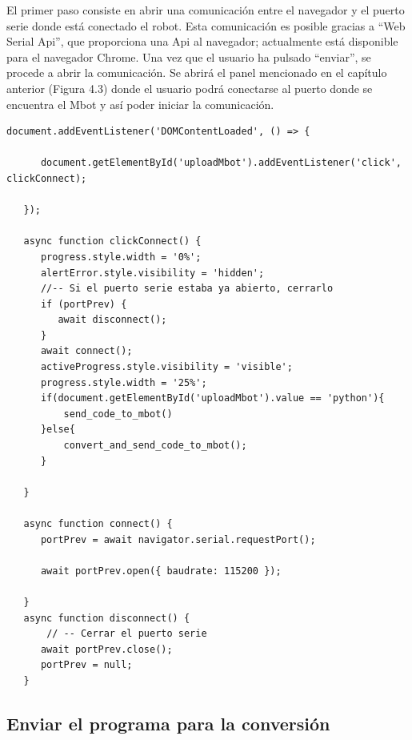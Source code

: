 \documentclass{report}
\begin{document}
El primer paso consiste en abrir una comunicación entre el navegador y el puerto serie donde está conectado el robot. Esta comunicación es posible gracias a “Web Serial Api”, que proporciona una Api al navegador; actualmente está disponible para el navegador Chrome.
Una vez que el usuario ha pulsado “enviar”, se procede a abrir la comunicación. Se abrirá el panel mencionado en el capítulo anterior (Figura 4.3) donde el usuario podrá conectarse al puerto donde se encuentra el Mbot y así poder iniciar la comunicación.
\\
\begin{lstlisting}[frame=single,breaklines=true, label="Abri conexion con el Mbot por el puerto serie", caption="Abrir conexion con el Mbot por el puerto serie", captionpos=b]  % Inicia el bloque de código
   document.addEventListener('DOMContentLoaded', () => {

      document.getElementById('uploadMbot').addEventListener('click', clickConnect);

   });

   async function clickConnect() {
      progress.style.width = '0%';
      alertError.style.visibility = 'hidden';
      //-- Si el puerto serie estaba ya abierto, cerrarlo
      if (portPrev) {
         await disconnect();
      }
      await connect();
      activeProgress.style.visibility = 'visible';
      progress.style.width = '25%';
      if(document.getElementById('uploadMbot').value == 'python'){
          send_code_to_mbot()
      }else{
          convert_and_send_code_to_mbot();
      }

   }

   async function connect() {
      portPrev = await navigator.serial.requestPort();

      await portPrev.open({ baudrate: 115200 });

   }
   async function disconnect() {
       // -- Cerrar el puerto serie
      await portPrev.close();
      portPrev = null;
   }
\end{lstlisting}

\subsection{Enviar el programa para la conversión}
\end{document}
